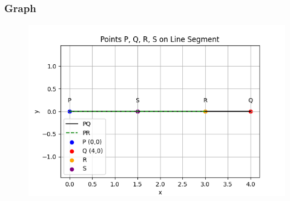 \documentclass{beamer}
\begin{document}
\begin{frame}[fragile]
\frametitle{Graph}


\begin{figure}[H]
\begin{center}
\includegraphics[width=0.75\columnwidth]{../figs/graph.png}
\end{center}
\caption{}
\label{fig:Fig}
\end{figure}



\end{frame}
\end{document}
